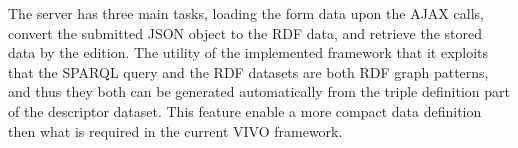 The server has three main tasks, loading the form data upon the AJAX calls, convert the submitted JSON object to the RDF data, and retrieve the stored data by the edition. The utility of the implemented framework that it exploits that the SPARQL query and the RDF datasets are both RDF graph patterns, and thus they both can be generated automatically from the triple definition part of the descriptor dataset. This feature enable a more compact data definition then what is required in the current VIVO framework.


